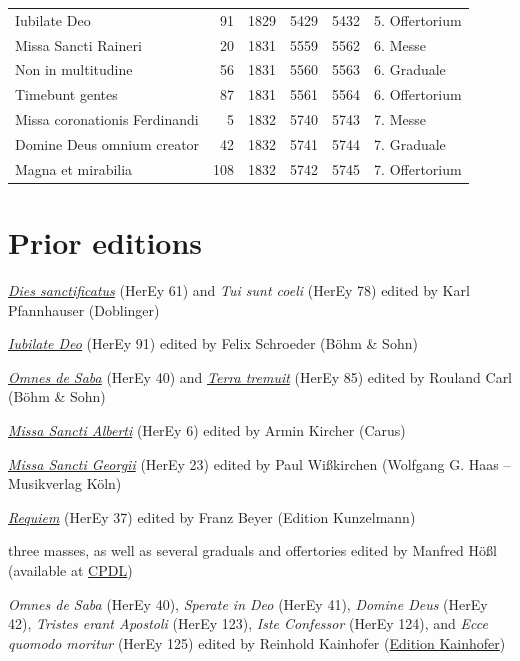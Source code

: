 \documentclass{ees}
\begin{document}
\begin{xltabular}{\linewidth}{lrcrrX}
  Iubilate Deo & 91 & 1829 & 5429 & 5432 & 5. Offertorium \\
  Missa Sancti Raineri & 20 & 1831 & 5559 & 5562 & 6. Messe \\
  Non in multitudine & 56 & 1831 & 5560 & 5563 & 6. Graduale \\
  Timebunt gentes & 87 & 1831 & 5561 & 5564 & 6. Offertorium \\
  Missa coronationis Ferdinandi & 5 & 1832 & 5740 & 5743 & 7. Messe \\
  Domine Deus omnium creator & 42 & 1832 & 5741 & 5744 & 7. Graduale \\
  Magna et mirabilia & 108 & 1832 & 5742 & 5745 & 7. Offertorium \\
  \bottomrule
\end{xltabular}


\section{Prior editions}

\begin{bulletlist}
  \item \href{https://www.doblinger.at/shop/okm-00005-st-dies-sanctificatus-tui-sunt-coeli-170430}{\textit{Dies sanctificatus}} (HerEy 61) and \textit{Tui sunt coeli} (HerEy 78) edited by Karl Pfannhauser (Doblinger)
  \item \href{https://boehm-und-sohn.de/produkt/jubilate-deo-4}{\textit{Iubilate Deo}} (HerEy 91) edited by Felix Schroeder (Böhm \& Sohn)
  \item \href{https://boehm-und-sohn.de/produkt/omnes-de-saba}{\textit{Omnes de Saba}} (HerEy 40) and \href{https://boehm-und-sohn.de/produkt/terra-tremuit}{\textit{Terra tremuit}} (HerEy 85) edited by Rouland Carl (Böhm \& Sohn)
  \item \href{https://www.carus-verlag.com/musiknoten-und-aufnahmen/eybler-missa-sancti-alberti-2708400.html}{\textit{Missa Sancti Alberti}} (HerEy 6) edited by Armin Kircher (Carus)
  \item \href{https://haas-koeln.de/epages/eb9c158e-5223-47bf-ab0c-87e8cfad2c49.sf/de_DE/?ObjectPath=/Shops/eb9c158e-5223-47bf-ab0c-87e8cfad2c49/Products/%22ISMN%20M-50000-256-7%22}{\textit{Missa Sancti Georgii}} (HerEy 23) edited by Paul Wißkirchen (Wolfgang G. Haas – Musikverlag Köln)
  \item \href{https://www.kunzelmann.ch/en/requiem-oct-10287}{\textit{Requiem}} (HerEy 37) edited by Franz Beyer (Edition Kunzelmann)
  \item three masses, as well as several graduals and offertories edited by Manfred Hößl (available at \href{https://www.cpdl.org/wiki/index.php/Josef_von_Eybler}{CPDL})
  \item \textit{Omnes de Saba} (HerEy 40), \textit{Sperate in Deo} (HerEy 41), \textit{Domine Deus} (HerEy 42), \textit{Tristes erant Apostoli} (HerEy 123), \textit{Iste Confessor} (HerEy 124), and \textit{Ecce quomodo moritur} (HerEy 125) edited by Reinhold Kainhofer (\href{https://edition-kainhofer.com}{Edition Kainhofer})
\end{bulletlist}
\end{document}
